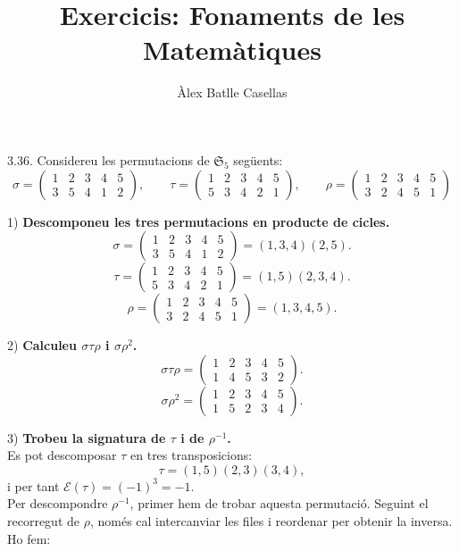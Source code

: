 \documentclass[11pt]{article}
\title{Exercicis: Fonaments de les Matemàtiques}
\author{Àlex Batlle Casellas}
\begin{document}
\begin{legal}
	\item[3.36.] Considereu les permutacions de $\mathfrak{S}_5$ següents:
	$$
	\sigma=
	\begin{pmatrix}
		1 & 2 & 3 & 4 & 5\\
		3 & 5 & 4 & 1 & 2
	\end{pmatrix},
	\qquad
	\tau=
	\begin{pmatrix}
		1 & 2 & 3 & 4 & 5\\
		5 & 3 & 4 & 2 & 1
	\end{pmatrix},
	\qquad
	\rho=
	\begin{pmatrix}
		1 & 2 & 3 & 4 & 5\\
		3 & 2 & 4 & 5 & 1
	\end{pmatrix}
	$$
	\begin{legal}
		\item[1) ]\textbf{Descomponeu les tres permutacions en producte de cicles.}
		$$\sigma=
		\begin{pmatrix}
			1 & 2 & 3 & 4 & 5\\
			3 & 5 & 4 & 1 & 2
		\end{pmatrix}
		=(1,3,4)(2,5).
		$$
		$$\tau=
		\begin{pmatrix}
			1 & 2 & 3 & 4 & 5\\
			5 & 3 & 4 & 2 & 1
		\end{pmatrix}
		=(1,5)(2,3,4).
		$$
		$$\rho=
		\begin{pmatrix}
			1 & 2 & 3 & 4 & 5\\
			3 & 2 & 4 & 5 & 1
		\end{pmatrix}
		=(1,3,4,5).
		$$
		\item[2) ]\textbf{Calculeu $\sigma\tau\rho$ i $\sigma\rho^2$.}
		$$
		\sigma\tau\rho=\begin{pmatrix}
		1 & 2 & 3 & 4 & 5\\
		1 & 4 & 5 & 3 & 2
		\end{pmatrix}.
		$$
		$$
		\sigma\rho^2=\begin{pmatrix}
		1 & 2 & 3 & 4 & 5\\
		1 & 5 & 2 & 3 & 4
		\end{pmatrix}.
		$$
		\item[3) ]\textbf{Trobeu la signatura de $\tau$ i de $\rho^{-1}$.}\\
		Es pot descomposar $\tau$ en tres transposicions:
		$$\tau=(1,5)(2,3)(3,4),$$
		i per tant $\mathcal{E}(\tau)=(-1)^3=-1.$\\
		Per descompondre $\rho^{-1}$, primer hem de trobar aquesta permutació. Seguint el recorregut de $\rho$, només cal intercanviar les files i reordenar per obtenir la inversa. Ho fem:

\end{legal}
\end{legal}
\end{document}

